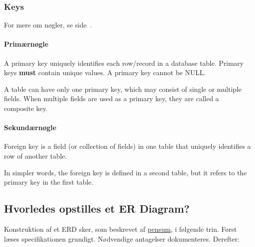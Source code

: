 \subsubsection{Keys}
For mere om nøgler, se side~\pageref{sec:keys}.

\paragraph{Primærnøgle}
A primary key uniquely identifies each row/record in a database table. Primary keys \textbf{must} contain unique values. A primary key cannot be NULL.

A table can have only one primary key, which may consist of single or multiple fields. When multiple fields are used as a primary key, they are called a composite key.

\paragraph{Sekundærnøgle}
Foreign key is a field (or collection of fields) in one table that uniquely identifies a row of another table. 

In simpler words, the foreign key is defined in a second table, but it refers to the primary key in the first table.

\subsection{Hvorledes opstilles et ER Diagram?}
Konstruktion af et ERD sker, som beskrevet af \href{http://db.grussell.org/section004.html#_Toc67114397}{pensum}, i følgende trin. Først læses specifikationen grundigt. Nødvendige antagelser dokumenteres. Derefter:

